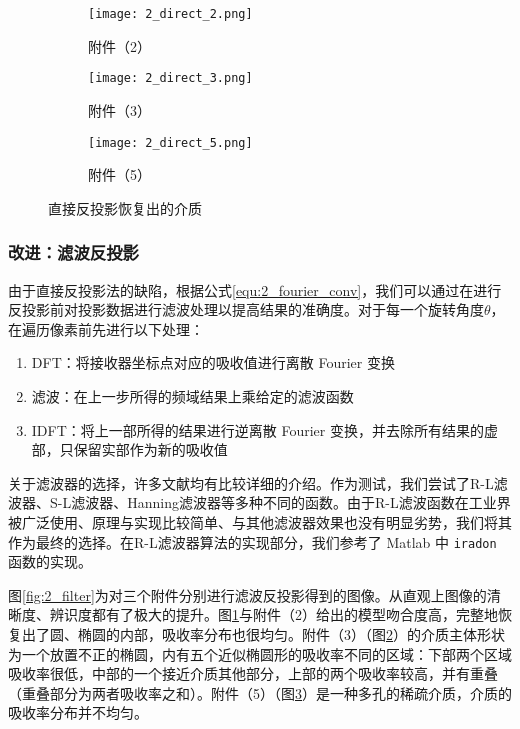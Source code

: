 \begin{figure}[htbp]
  \centering

  \begin{subfigure}[b]{0.3\textwidth}
    \texttt{[image: 2\_direct\_2.png]}
    \caption{附件（2）}
    \label{fig:2_direct:2}
  \end{subfigure}%
  \hfill
  \begin{subfigure}[b]{0.3\textwidth}
    \texttt{[image: 2\_direct\_3.png]}
    \caption{附件（3）}
    \label{fig:2_direct:3}
  \end{subfigure}%
  \hfill
  \begin{subfigure}[b]{0.3\textwidth}
    \texttt{[image: 2\_direct\_5.png]}
    \caption{附件（5）}
    \label{fig:2_direct:5}
  \end{subfigure}

  \caption{直接反投影恢复出的介质}
  \label{fig:2_direct}
\end{figure}

\subsubsection{改进：滤波反投影}
由于直接反投影法的缺陷，根据公式\ref{equ:2_fourier_conv}，我们可以通过在进行反投影前对投影数据进行滤波处理以提高结果的准确度。对于每一个旋转角度$\theta$，在遍历像素前先进行以下处理：
\begin{enumerate}
  \item DFT：将接收器坐标点对应的吸收值进行离散 Fourier 变换
  \item 滤波：在上一步所得的频域结果上乘给定的滤波函数
  \item IDFT：将上一部所得的结果进行逆离散 Fourier 变换，并去除所有结果的虚部，只保留实部作为新的吸收值
\end{enumerate}

关于滤波器的选择，许多文献均有比较详细的介绍\cite{gao2010}。作为测试，我们尝试了R-L滤波器、S-L滤波器、Hanning滤波器等多种不同的函数。由于R-L滤波函数在工业界被广泛使用、原理与实现比较简单、与其他滤波器效果也没有明显劣势，我们将其作为最终的选择。在R-L滤波器算法的实现部分，我们参考了 Matlab 中 \texttt{iradon} 函数的实现。

图\ref{fig:2_filter}为对三个附件分别进行滤波反投影得到的图像。从直观上图像的清晰度、辨识度都有了极大的提升。图\ref{fig:2_direct:2}与附件（2）给出的模型吻合度高，完整地恢复出了圆、椭圆的内部，吸收率分布也很均匀。附件（3）（图\ref{fig:2_direct:3}）的介质主体形状为一个放置不正的椭圆，内有五个近似椭圆形的吸收率不同的区域：下部两个区域吸收率很低，中部的一个接近介质其他部分，上部的两个吸收率较高，并有重叠（重叠部分为两者吸收率之和）。附件（5）（图\ref{fig:2_direct:5}）是一种多孔的稀疏介质，介质的吸收率分布并不均匀。

